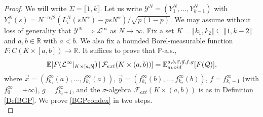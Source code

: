 \begin{proof}
	We will write $\Sigma = \llbracket 1,k\rrbracket$. Let us write $\mathcal{Y}^N = (Y^N_1,\dots,Y^N_{k-1})$ with $Y^N_i(s) = N^{-\alpha/2}(L^N_i(sN^\alpha)-psN^\alpha)/\sqrt{p(1-p)}$. We may assume without loss of generality that $\mathcal{Y}^N \implies \mathcal{L}^\infty$ as $N\to\infty$. Fix a set $K = \llbracket k_1,k_2\rrbracket \subseteq \llbracket 1, k-2\rrbracket$ and $a,b\in\mathbb{R}$ with $a<b$. We also fix a bounded Borel-measurable function $F:C(K\times[a,b])\to\mathbb{R}$. It suffices to prove that $\mathbb{P}$-a.s.,
	\begin{equation}\label{BGPcondex}
		\mathbb{E}[F(\mathcal{L}^\infty|_{K\times[a,b]})\,|\,\mathcal{F}_{ext}(K\times(a,b))] = \mathbb{E}^{a,b,\vec{x},\vec{y},f,g}_{avoid}[F(\mathcal{Q})],
	\end{equation}
	where $\vec{x} = (f^\infty_{k_1}(a),\dots,f^\infty_{k_2}(a))$, $\vec{y} = (f^\infty_{k_1}(b),\dots,f^\infty_{k_2}(b))$, $f=f^\infty_{k_1-1}$ (with $f^\infty_0 = +\infty$), $g=f^\infty_{k_2+1}$, and the $\sigma$-algebra $\mathcal{F}_{ext}(K\times(a,b))$ is as in Definition \ref{DefBGP}. We prove \eqref{BGPcondex} in two steps.\\
	

\end{proof}
